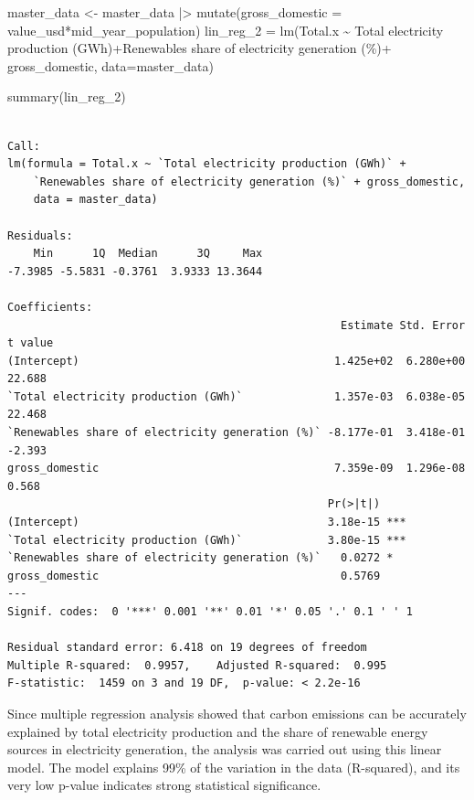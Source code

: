 \documentclass[
  letterpaper,
  DIV=11,
  numbers=noendperiod]{scrartcl}
\newenvironment{Shaded}{\begin{snugshade}}{\end{snugshade}}
\newcommand{\AttributeTok}[1]{\textcolor[rgb]{0.40,0.45,0.13}{#1}}
\newcommand{\FunctionTok}[1]{\textcolor[rgb]{0.28,0.35,0.67}{#1}}
\newcommand{\NormalTok}[1]{\textcolor[rgb]{0.00,0.23,0.31}{#1}}
\newcommand{\OtherTok}[1]{\textcolor[rgb]{0.00,0.23,0.31}{#1}}
\newcommand{\SpecialCharTok}[1]{\textcolor[rgb]{0.37,0.37,0.37}{#1}}
\newcommand{\StringTok}[1]{\textcolor[rgb]{0.13,0.47,0.30}{#1}}
\begin{document}
\begin{Shaded}
\begin{Highlighting}[]
\NormalTok{master\_data }\OtherTok{\textless{}{-}}\NormalTok{ master\_data }\SpecialCharTok{|\textgreater{}} \FunctionTok{mutate}\NormalTok{(}\AttributeTok{gross\_domestic =}\NormalTok{ value\_usd}\SpecialCharTok{*}\NormalTok{mid\_year\_population)}
\NormalTok{lin\_reg\_2 }\OtherTok{=} \FunctionTok{lm}\NormalTok{(Total.x }\SpecialCharTok{\textasciitilde{}} \StringTok{\textasciigrave{}}\AttributeTok{Total electricity production (GWh)}\StringTok{\textasciigrave{}}\SpecialCharTok{+}\StringTok{\textasciigrave{}}\AttributeTok{Renewables share of electricity generation (\%)}\StringTok{\textasciigrave{}}\SpecialCharTok{+}\NormalTok{ gross\_domestic, }\AttributeTok{data=}\NormalTok{master\_data)}

\FunctionTok{summary}\NormalTok{(lin\_reg\_2)}
\end{Highlighting}
\end{Shaded}

\begin{verbatim}

Call:
lm(formula = Total.x ~ `Total electricity production (GWh)` + 
    `Renewables share of electricity generation (%)` + gross_domestic, 
    data = master_data)

Residuals:
    Min      1Q  Median      3Q     Max 
-7.3985 -5.5831 -0.3761  3.9333 13.3644 

Coefficients:
                                                   Estimate Std. Error t value
(Intercept)                                       1.425e+02  6.280e+00  22.688
`Total electricity production (GWh)`              1.357e-03  6.038e-05  22.468
`Renewables share of electricity generation (%)` -8.177e-01  3.418e-01  -2.393
gross_domestic                                    7.359e-09  1.296e-08   0.568
                                                 Pr(>|t|)    
(Intercept)                                      3.18e-15 ***
`Total electricity production (GWh)`             3.80e-15 ***
`Renewables share of electricity generation (%)`   0.0272 *  
gross_domestic                                     0.5769    
---
Signif. codes:  0 '***' 0.001 '**' 0.01 '*' 0.05 '.' 0.1 ' ' 1

Residual standard error: 6.418 on 19 degrees of freedom
Multiple R-squared:  0.9957,    Adjusted R-squared:  0.995 
F-statistic:  1459 on 3 and 19 DF,  p-value: < 2.2e-16
\end{verbatim}

Since multiple regression analysis showed that carbon emissions can be
accurately explained by total electricity production and the share of
renewable energy sources in electricity generation, the analysis was
carried out using this linear model. The model explains 99\% of the
variation in the data (R-squared), and its very low p-value indicates
strong statistical significance.
\end{document}
